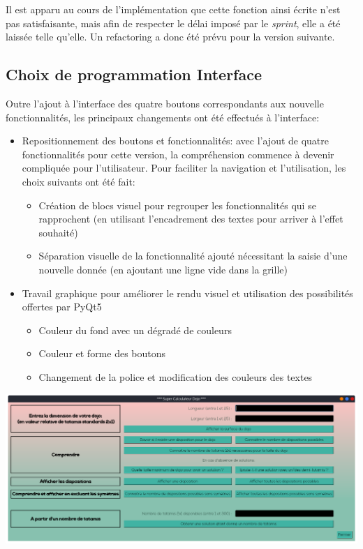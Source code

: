 Il est apparu au cours de l'implémentation que cette fonction ainsi écrite n'est pas satisfaisante, mais afin
de respecter le délai imposé par le \emph{sprint}, elle a été laissée telle qu'elle. Un refactoring a donc été
prévu pour la version suivante.

\subsection{Choix de programmation Interface}

Outre l’ajout à l'interface des quatre boutons correspondants aux nouvelle fonctionnalités, 
les principaux changements ont été effectués à l’interface:

\begin{itemize}
    \item Repositionnement des boutons et fonctionnalités: avec l’ajout de quatre fonctionnalités 
    pour cette version, la compréhension commence à devenir compliquée pour l’utilisateur. 
    Pour faciliter la navigation et l’utilisation, les choix suivants ont été fait:
    \begin{itemize}
        \item Création de blocs visuel pour regrouper les fonctionnalités qui se rapprochent 
        (en utilisant l’encadrement des textes pour arriver à l'effet souhaité)
        \item Séparation visuelle de la fonctionnalité ajouté nécessitant la saisie d’une nouvelle 
        donnée (en ajoutant une ligne vide dans la grille)
    \end{itemize}

    \item Travail graphique pour améliorer le rendu visuel et utilisation des possibilités offertes par PyQt5
    
    \begin{itemize}
        \item  Couleur du fond avec un dégradé de couleurs
        \item Couleur et forme des boutons
        \item Changement de la police et modification des couleurs des textes
    \end{itemize}
\end{itemize}


\begin{center}
    \includegraphics[width=16cm]{images/releaseInterface2.png}
\end{center}

